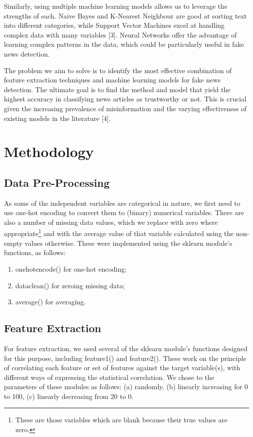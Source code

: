 \documentclass[12pt,a4paper]{article}
\begin{document}
	Similarly, using multiple machine learning models allows us to leverage the strengths of each. Naive Bayes and K-Nearest Neighbour are good at sorting text into different categories, while Support Vector Machines excel at handling complex data with many variables [3]. Neural Networks offer the advantage of learning complex patterns in the data, which could be particularly useful in fake news detection.

	The problem we aim to solve is to identify the most effective combination of feature extraction techniques and machine learning models for fake news detection. The ultimate goal is to find the method and model that yield the highest accuracy in classifying news articles as trustworthy or not. This is crucial given the increasing prevalence of misinformation and the varying effectiveness of existing models in the literature [4].
	
	\section{Methodology}\label{sec:meth}
	\subsection{Data Pre-Processing}
	As some of the independent variables are categorical in nature, we first need to use one-hot encoding to convert them to (binary) numerical variables. There are also a number of missing data values, which we replace with zero where appropriate\footnote{These are those variables which are blank because their true values are zero.} and with the average value of that variable calculated using the non-empty values otherwise. These were implemented using the \textsf{sklearn} module's functions, as follows:
	\begin{enumerate}
		\item \textsf{onehotencode()} for one-hot encoding; 
		\item \textsf{dataclean()} for zeroing missing data;
		\item \textsf{average()} for averaging.
	\end{enumerate}
	
	\subsection{Feature Extraction}
	For feature extraction, we used several of the \textsf{sklearn} module's functions designed for this purpose, including \textsf{feature1()} and \textsf{feature2()}. These work on the principle of correlating each feature or set of features against the target variable(s), with different ways of expressing the statistical correlation. We chose to the parameters of these modules as follows: (a) randomly, (b) linearly increasing for 0 to 100, (c) linearly decreasing from 20 to 0.
	
\end{document}
